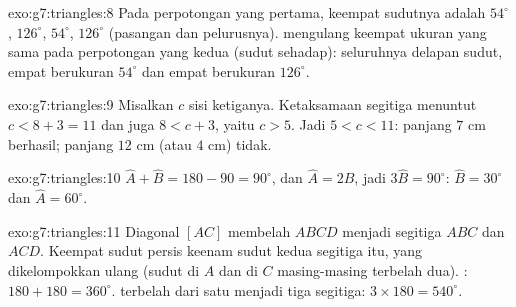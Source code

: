 \begin{solution}{exo:g7:triangles:8}
Pada perpotongan yang pertama, keempat sudutnya adalah $54^\circ$,
$126^\circ$, $54^\circ$, $126^\circ$ (pasangan  dan
pelurusnya).  mengulang keempat ukuran yang sama pada
perpotongan yang kedua (sudut sehadap): seluruhnya delapan sudut,
empat berukuran $54^\circ$ dan empat berukuran $126^\circ$.
\end{solution}

\begin{solution}{exo:g7:triangles:9}
Misalkan $c$ sisi ketiganya. Ketaksamaan segitiga menuntut
$c < 8 + 3 = 11$ dan juga $8 < c + 3$, yaitu $c > 5$. Jadi
$5 < c < 11$: panjang $7$ cm berhasil; panjang $12$ cm (atau $4$ cm)
tidak.
\end{solution}

\begin{solution}{exo:g7:triangles:10}
$\widehat A + \widehat B = 180 - 90 = 90^\circ$, dan
$\widehat A = 2\widehat B$, jadi $3\widehat B = 90^\circ$:
$\widehat B = 30^\circ$ dan $\widehat A = 60^\circ$.
\end{solution}

\begin{solution}{exo:g7:triangles:11}
Diagonal $[AC]$ membelah $ABCD$ menjadi segitiga $ABC$ dan $ACD$.
Keempat sudut  persis keenam sudut kedua segitiga itu,
yang dikelompokkan ulang (sudut di $A$ dan di $C$ masing-masing
terbelah dua). : $180 + 180 = 360^\circ$.  terbelah
dari satu  menjadi tiga segitiga: $3 \times 180 = 540^\circ$.
\end{solution}

